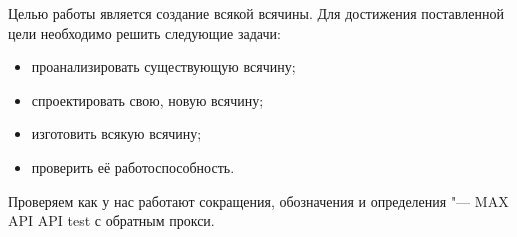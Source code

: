 \Introduction

Целью работы является создание всякой всячины. Для достижения поставленной цели необходимо решить следующие задачи:

\begin{itemize}
\item проанализировать существующую всячину;
\item спроектировать свою, новую всячину;
\item изготовить всякую всячину;
\item проверить её работоспособность.
\end{itemize}

Проверяем как у нас работают сокращения, обозначения и определения "---
\gls{MAX}
API 
\gls{API}
\gls{test}
с обратным прокси.




